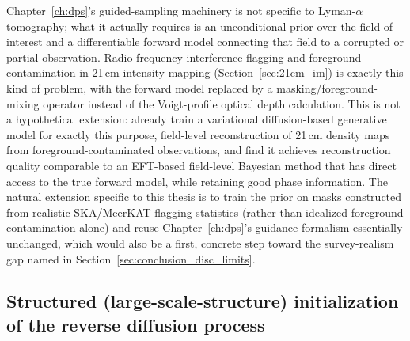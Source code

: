 Chapter~\ref{ch:dps}'s guided-sampling machinery is not specific to Lyman-$\alpha$ tomography; what it actually requires is an unconditional prior over the field of interest and a differentiable forward model connecting that field to a corrupted or partial observation. Radio-frequency interference flagging and foreground contamination in 21\,cm intensity mapping (Section~\ref{sec:21cm_im}) is exactly this kind of problem, with the forward model replaced by a masking/foreground-mixing operator instead of the Voigt-profile optical depth calculation. This is not a hypothetical extension: \citet{chen_chen_dvorkin_2025} already train a variational diffusion-based generative model for exactly this purpose, field-level reconstruction of 21\,cm density maps from foreground-contaminated observations, and find it achieves reconstruction quality comparable to an EFT-based field-level Bayesian method that has direct access to the true forward model, while retaining good phase information. The natural extension specific to this thesis is to train the prior on masks constructed from realistic SKA/MeerKAT flagging statistics (rather than idealized foreground contamination alone) and reuse Chapter~\ref{ch:dps}'s guidance formalism essentially unchanged, which would also be a first, concrete step toward the survey-realism gap named in Section~\ref{sec:conclusion_disc_limits}.

\subsection{Structured (large-scale-structure) initialization of the reverse diffusion process}
\label{sec:conclusion_future_lss_init}

